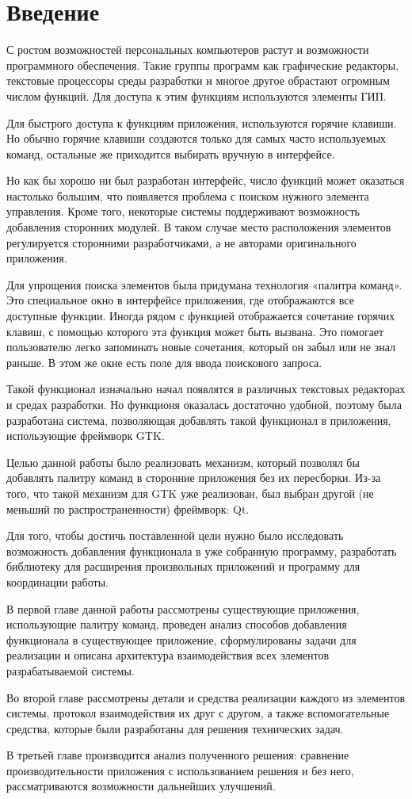 \chapter*{Введение}

С ростом возможностей персональных компьютеров растут и возможности программного
обеспечения. Такие группы программ как графические редакторы, текстовые
процессоры среды разработки и многое другое обрастают огромным числом функций.
Для доступа к этим функциям используются элементы ГИП.

Для быстрого доступа к функциям приложения, используются горячие клавиши. Но
обычно горячие клавиши создаются только для самых часто используемых команд,
остальные же приходится выбирать вручную в интерфейсе.

Но как бы хорошо ни был разработан интерфейс, число функций может оказаться
настолько большим, что появляется проблема с поиском нужного элемента
управления. Кроме того, некоторые системы поддерживают возможность добавления
сторонних модулей. В таком случае место расположения элементов регулируется
сторонними разработчиками, а не авторами оригинального приложения.

Для упрощения поиска элементов была придумана технология «палитра команд». Это
специальное окно в интерфейсе приложения, где отображаются все доступные
функции.
Иногда рядом с функцией отображается сочетание горячих клавиш, с помощью
которого эта функция может быть вызвана. Это помогает пользователю легко
запоминать новые сочетания, который он забыл или не знал раньше.
В этом же окне есть поле для ввода поискового запроса.

Такой функционал изначально начал появлятся в различных текстовых редакторах и
средах разработки. Но функционя оказалась достаточно удобной, поэтому была
разработана система, позволяющая добавлять такой функционал в приложения,
использующие фреймворк GTK.

Целью данной работы было реализовать механизм, который позволял бы добавлять
палитру команд в сторонние приложения без их пересборки. Из-за того, что такой
механизм для GTK уже реализован, был выбран другой (не меньший по
распространенности) фреймворк: Qt.

Для того, чтобы достичь поставленной цели нужно было исследовать возможность
добавления функционала в уже собранную программу, разработать библиотеку для
расширения произвольных приложений и программу для координации работы.

В первой главе данной работы рассмотрены существующие приложения, использующие
палитру команд, проведен анализ способов добавления функционала в существующее
приложение, сформулированы задачи для реализации и описана архитектура
взаимодействия всех элементов разрабатываемой системы.

Во второй главе рассмотрены детали и средства реализации каждого из элементов
системы, протокол взаимодействия их друг с другом, а также вспомогательные
средства, которые были разработаны для решения технических задач.

В третьей главе производится анализ полученного решения: сравнение
производительности приложения с использованием решения и без него,
рассматриваются возможности дальнейших улучшений.
